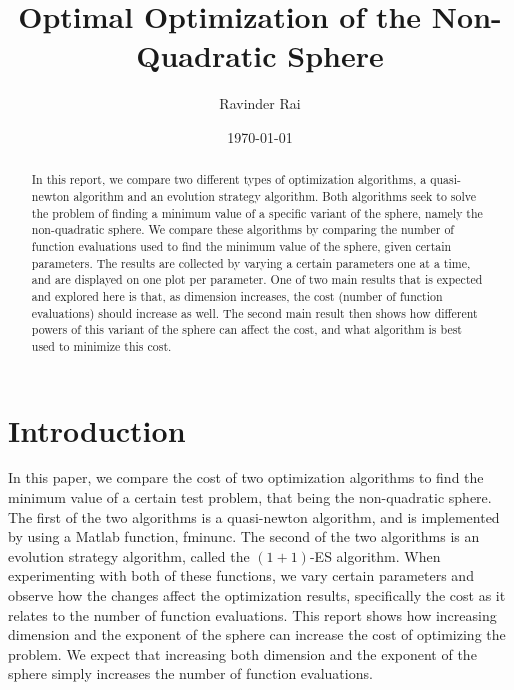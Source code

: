 \documentclass[sigconf, 7pt]{acmart}
\title{\textbf{Optimal Optimization of the Non-Quadratic Sphere}}
\author{Ravinder Rai}
\date{\today}
\begin{document}
 


\begin{abstract}
In this report, we compare two different types of optimization algorithms, a quasi-newton algorithm and an evolution strategy algorithm. Both algorithms seek to solve the problem of finding a minimum value of a specific variant of the sphere, namely the non-quadratic sphere. We compare these algorithms by comparing the number of function evaluations used to find the minimum value of the sphere, given certain parameters. The results are collected by varying a certain parameters one at a time, and are displayed on one plot per parameter. One of two main results that is expected and explored here is that, as dimension increases, the cost (number of function evaluations) should increase as well. The second main result then shows how different powers of this variant of the sphere can affect the cost, and what algorithm is best used to minimize this cost.
\end{abstract}
\maketitle

\section{Introduction}
\label{sec:intro}

In this paper, we compare the cost of two optimization algorithms to find the minimum value of a certain test problem, that being the non-quadratic sphere. The first of the two algorithms is a quasi-newton algorithm, and is implemented by using a Matlab function, fminunc. The second of the two algorithms is an evolution strategy algorithm, called the $(1+1)$-ES algorithm. When experimenting with both of these functions, we vary certain parameters and observe how the changes affect the optimization results, specifically the cost as it relates to the number of function evaluations. This report shows how increasing dimension and the exponent of the sphere can increase the cost of optimizing the problem. We expect that increasing both dimension and the exponent of the sphere simply increases the number of function evaluations. 
\end{document}
